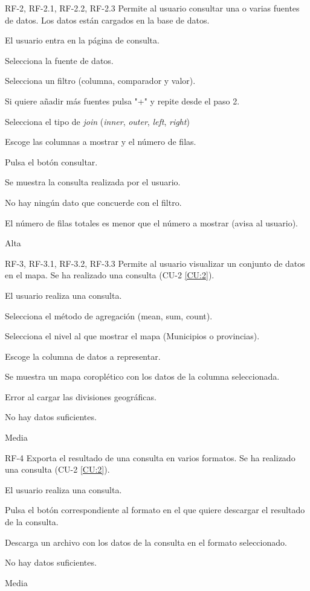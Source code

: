 
{RF-2, RF-2.1, RF-2.2, RF-2.3}
{Permite al usuario consultar una o varias fuentes de datos.}
{Los datos están cargados en la base de datos.}
{
	\item El usuario entra en la página de consulta.
	\item Selecciona la fuente de datos.
	\item Selecciona un filtro (columna, comparador y valor).
	\item Si quiere añadir más fuentes pulsa "+" y repite desde el paso 2.
	\item Selecciona el tipo de \textit{join} (\textit{inner}, \textit{outer}, \textit{left}, \textit{right})
	\item Escoge las columnas a mostrar y el número de filas.
	\item Pulsa el botón consultar.
}
{Se muestra la consulta realizada por el usuario.}
{
	\item No hay ningún dato que concuerde con el filtro.
	\item El número de filas totales es menor que el número a mostrar (avisa al usuario).
}
{Alta}


{RF-3, RF-3.1, RF-3.2, RF-3.3}
{Permite al usuario visualizar un conjunto de datos en el mapa.}
{Se ha realizado una consulta (CU-2 \ref{CU:2}).}
{
	\item El usuario realiza una consulta.
	\item Selecciona el método de agregación (mean, sum, count).
	\item Selecciona el nivel al que mostrar el mapa (Municipios o provincias).
	\item Escoge la columna de datos a representar.
}
{Se muestra un mapa coroplético con los datos de la columna seleccionada.}
{
	\item Error al cargar las divisiones geográficas.
	\item No hay datos suficientes.
}
{Media}


{RF-4}
{Exporta el resultado de una consulta en varios formatos.}
{Se ha realizado una consulta (CU-2 \ref{CU:2}).}
{
	\item El usuario realiza una consulta.
	\item Pulsa el botón correspondiente al formato en el que quiere descargar el resultado de la consulta.
}
{Descarga un archivo con los datos de la consulta en el formato seleccionado.}
{
	\item No hay datos suficientes.
}
{Media}

